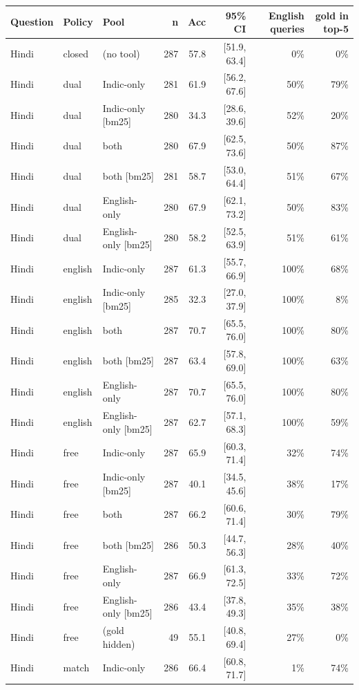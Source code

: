 \begin{table}[h]\centering\scriptsize
\begin{tabular}{lllrrrrr}
\toprule
Question & Policy & Pool & n & Acc & 95\% CI & English queries & gold in top-5 \\
\midrule
Hindi & closed & (no tool) & 287 & 57.8 & [51.9, 63.4] & 0\% & 0\% \\
Hindi & dual & Indic-only & 281 & 61.9 & [56.2, 67.6] & 50\% & 79\% \\
Hindi & dual & Indic-only [bm25] & 280 & 34.3 & [28.6, 39.6] & 52\% & 20\% \\
Hindi & dual & both & 280 & 67.9 & [62.5, 73.6] & 50\% & 87\% \\
Hindi & dual & both [bm25] & 281 & 58.7 & [53.0, 64.4] & 51\% & 67\% \\
Hindi & dual & English-only & 280 & 67.9 & [62.1, 73.2] & 50\% & 83\% \\
Hindi & dual & English-only [bm25] & 280 & 58.2 & [52.5, 63.9] & 51\% & 61\% \\
Hindi & english & Indic-only & 287 & 61.3 & [55.7, 66.9] & 100\% & 68\% \\
Hindi & english & Indic-only [bm25] & 285 & 32.3 & [27.0, 37.9] & 100\% & 8\% \\
Hindi & english & both & 287 & 70.7 & [65.5, 76.0] & 100\% & 80\% \\
Hindi & english & both [bm25] & 287 & 63.4 & [57.8, 69.0] & 100\% & 63\% \\
Hindi & english & English-only & 287 & 70.7 & [65.5, 76.0] & 100\% & 80\% \\
Hindi & english & English-only [bm25] & 287 & 62.7 & [57.1, 68.3] & 100\% & 59\% \\
Hindi & free & Indic-only & 287 & 65.9 & [60.3, 71.4] & 32\% & 74\% \\
Hindi & free & Indic-only [bm25] & 287 & 40.1 & [34.5, 45.6] & 38\% & 17\% \\
Hindi & free & both & 287 & 66.2 & [60.6, 71.4] & 30\% & 79\% \\
Hindi & free & both [bm25] & 286 & 50.3 & [44.7, 56.3] & 28\% & 40\% \\
Hindi & free & English-only & 287 & 66.9 & [61.3, 72.5] & 33\% & 72\% \\
Hindi & free & English-only [bm25] & 286 & 43.4 & [37.8, 49.3] & 35\% & 38\% \\
Hindi & free & (gold hidden) & 49 & 55.1 & [40.8, 69.4] & 27\% & 0\% \\
Hindi & match & Indic-only & 286 & 66.4 & [60.8, 71.7] & 1\% & 74\% \\

\end{tabular}
\end{table}
